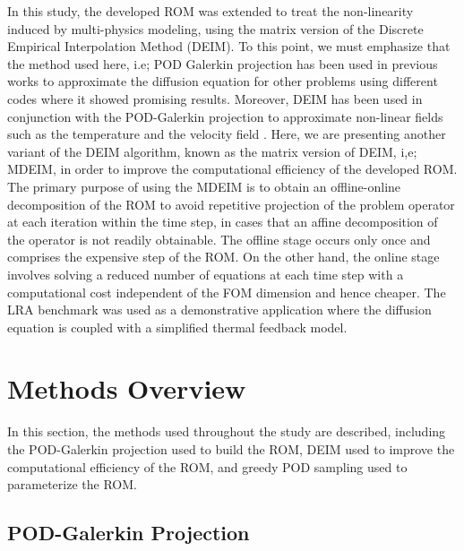 \documentclass[review,number,sort&compress,12pt]{elsarticle}
\begin{document}
In this study, the developed ROM was extended to treat the non-linearity induced by multi-physics modeling, using the matrix version of the  Discrete Empirical Interpolation Method (DEIM).
To this point, we must emphasize that the method used here, i.e; POD Galerkin projection has been used in previous works to approximate the diffusion equation \cite{sartori2014comparison, sartori2014reduced} for other problems using different codes where it showed promising results.
Moreover, DEIM has been used in conjunction with the POD-Galerkin projection to approximate non-linear fields such as the temperature and the velocity field \cite{german2019application, german2022gen}.  
Here, we are presenting another variant of the DEIM algorithm, known as the matrix version of DEIM, i,e; MDEIM, in order to improve the computational efficiency of the developed ROM.
The primary purpose of using the MDEIM is to obtain an offline-online decomposition of the ROM to avoid repetitive projection of the problem operator at each iteration within the time step, in cases that an affine decomposition of the operator is not readily obtainable.
The offline stage occurs only once and comprises the expensive step of the ROM.
On the other hand, the online stage involves solving a reduced number of equations at each time step with a computational cost independent of the FOM dimension and hence cheaper.
The LRA benchmark was used as a demonstrative application where the diffusion equation is coupled with a simplified thermal feedback model.


\section{Methods Overview}

In this section, the methods used throughout the study are described, including the POD-Galerkin projection used to build the ROM, DEIM used to improve the computational efficiency of the ROM, and greedy POD sampling used to parameterize the ROM.


\subsection{POD-Galerkin Projection}
\label{sec:POD}
\end{document}
